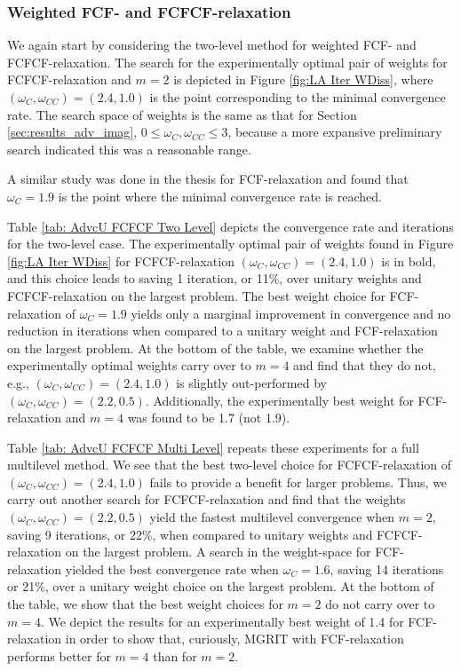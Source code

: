 \documentclass[VANCOUVER,STIX1COL]{WileyNJD-v2}
\begin{document}
\subsubsection{Weighted FCF- and FCFCF-relaxation}
We again start by considering the two-level method for weighted FCF- and FCFCF-relaxation.  The search
for the experimentally optimal pair of weights for FCFCF-relaxation and $m=2$ is depicted in Figure 
\ref{fig:LA Iter WDiss}, where $(\omega_C, \omega_{CC}) = (2.4, 1.0)$ is the point corresponding to the minimal
convergence rate.  The search space of weights is the same as that for Section 
\ref{sec:results_adv_imag}, $0 \le \omega_C, \omega_{CC} \le 3$,  because 
a more expansive preliminary search indicated this was a reasonable range.

A similar study was done in the thesis \cite{Su2019} for FCF-relaxation 
and found that $\omega_C = 1.9$ is the point where the minimal convergence rate is reached.

Table \ref{tab: AdvcU FCFCF Two Level} depicts the convergence rate and iterations for the two-level case.  The 
experimentally optimal pair of weights found in Figure \ref{fig:LA Iter WDiss} for FCFCF-relaxation $(\omega_C, \omega_{CC}) = (2.4, 1.0)$
is in bold, and this choice leads
to saving 1 iteration, or 11\%, over unitary weights and FCFCF-relaxation on the largest problem.  
The best weight choice for FCF-relaxation 
of $\omega_C = 1.9$ yields only a marginal improvement in convergence and no reduction in iterations when compared to a unitary 
weight and FCF-relaxation on the largest problem.  At the bottom of the table, we examine whether the experimentally optimal weights carry
over to $m=4$ and find that they do not, e.g., $(\omega_C, \omega_{CC}) = (2.4, 1.0)$ is slightly out-performed by
$(\omega_C, \omega_{CC}) = (2.2, 0.5)$.  Additionally, the experimentally best weight for FCF-relaxation and $m=4$ was found to
be 1.7 (not 1.9).   

Table \ref{tab: AdvcU FCFCF Multi Level} repeats these experiments for a full multilevel method.  We see that the 
best two-level choice for FCFCF-relaxation of $(\omega_C, \omega_{CC}) = (2.4, 1.0)$ fails to provide a benefit for larger problems.  Thus,
we carry out another search for FCFCF-relaxation and find that the weights $(\omega_C, \omega_{CC}) = (2.2, 0.5)$ yield the fastest multilevel
convergence when $m=2$, saving 9 iterations, or 22\%, when compared to unitary weights and FCFCF-relaxation on the 
largest problem.  A search in the weight-space for FCF-relaxation yielded the best convergence rate when 
$\omega_C = 1.6$, saving 14 iterations or 21\%, over a unitary weight choice on the largest problem.  At the bottom of the table, we show that the best weight choices for $m=2$ do not carry over
to $m=4$.  We depict the results for an experimentally best weight of 
1.4 for FCF-relaxation in order to show that, curiously, MGRIT with FCF-relaxation performs better for $m=4$ than for $m=2$.
\end{document}
